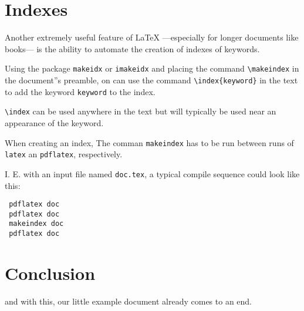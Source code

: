 \documentclass{article}
\begin{document}
\section{Indexes}

Another extremely useful feature of  {\LaTeX} ---especially for longer documents like books--- is the ability to automate the creation of indexes of keywords.

Using the package \verb+makeidx+ or \verb+imakeidx+ and placing the  command  \verb+\makeindex+ in the document''s preamble, on can use the command \verb+\index{keyword}+ in the text to add the keyword  \texttt{keyword} to the index.

\verb+\index+ can be used anywhere in the text but will typically be used near an  appearance of the keyword.

When creating an index,  The comman \verb+makeindex+ has to be run between runs of \verb+latex+ an \verb+pdflatex+, respectively.

I. E. with an input file named \verb+doc.tex+, a typical compile sequence could look like this:



\begin{lstlisting}
 pdflatex doc
 pdflatex doc
 makeindex doc
 pdflatex doc
\end{lstlisting}








\section{Conclusion}

and with this, our little example document already comes to an end.



\printindex
{}
\end{document}
